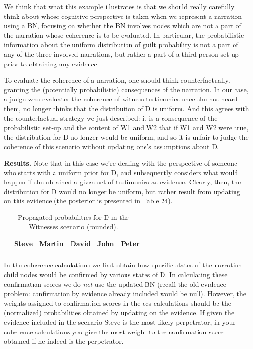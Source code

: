 \documentclass[
  10pt,
]{scrartcl}
\newcommand{\s}[1]{\textsf{#1}}
\begin{document}
We think that what this example illustrates is that we should really carefully think about whose cognitive perspective is taken when we represent a narration using a BN, focusing on whether the BN involves nodes which are not a part of the narration whose coherence is to be evaluated. In particular, the probabilistic information about the uniform distribution of guilt probability is not a part of any of the three involved narrations, but rather a part of a third-person set-up prior to obtaining any evidence.

To evaluate the coherence of a narration, one should think counterfactually, granting the (potentially probabilistic) consequences of the narration. In our case, a judge who evaluates the coherence of witness testimonies once she has heard them, no longer thinks that the distribution of \textsf{D} is uniform. And this agrees with the counterfactual strategy we just described: it is a consequence of the probabilistic set-up and the content of \textsf{W1} and \textsf{W2} that if \textsf{W1} and \textsf{W2} were true, the distribution for \textsf{D} no longer would be uniform, and so it is unfair to judge the coherence of this scenario without updating one's assumptions about \textsf{D}.

\textbf{Results.} Note that in this case we're dealing with the perspective of someone who starts with a uniform prior for \s{D}, and subsequently considers what would happen if she obtained a given set of testimonies as evidence. Clearly, then, the distribution for \s{D} would no longer be uniform, but rather result from updating on this evidence (the posterior is presented in Table 24).

\begin{table}[H]

\caption{\label{tab:witnessesWeights}Propagated probabilities for D in the Witnesses scenario (rounded).}
\centering
\begin{tabular}[t]{lrrrrr}
\toprule
  & Steve & Martin & David & John & Peter\\
\midrule
\cellcolor{gray!6}{Pr} & \cellcolor{gray!6}{0.981} & \cellcolor{gray!6}{0.004} & \cellcolor{gray!6}{0.004} & \cellcolor{gray!6}{0.004} & \cellcolor{gray!6}{0.004}\\
\bottomrule
\end{tabular}
\end{table}

In the coherence calculations we first obtain how specific states of the narration child nodes would be confirmed by various states of \s{D}. In calculating these confirmation scores we do \emph{not} use the updated BN (recall the old evidence problem: confirmation by evidence already included would be null). However, the weights assigned to confirmation scores in the \s{ecs} calculations should be the (normalized) probabilities obtained by updating on the evidence. If given the evidence included in the scenario Steve is the most likely perpetrator, in your coherence calculations you give the most weight to the confirmation score obtained if he indeed is the perpetrator.
\end{document}
